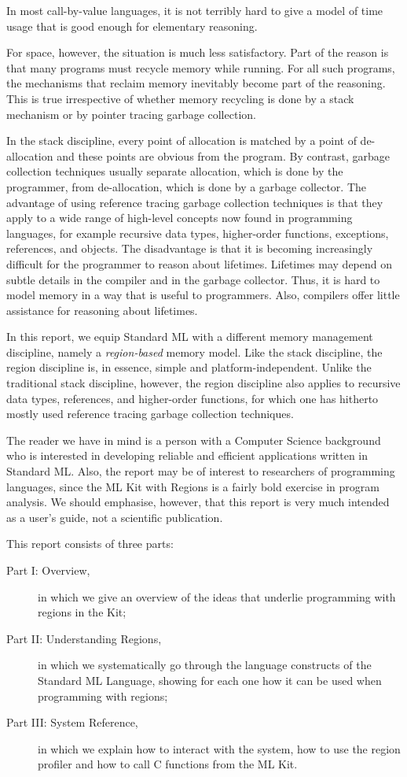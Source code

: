 \documentclass[12pt]{book}
\begin{document}
In most call-by-value languages, it is not terribly hard to give a
model of time usage that is good enough for elementary reasoning. 

For space, however, the situation is much less satisfactory. Part of
the reason is that many programs must recycle memory while running.
For all such programs, the mechanisms that reclaim memory inevitably
become part of the reasoning.  This is true irrespective of whether memory
recycling is done by a stack mechanism or by pointer tracing garbage
collection.

In the stack discipline, every point of allocation is matched by a
point of de-allocation and these points are obvious from the
program. By contrast, garbage collection techniques usually separate
allocation, which is done by the programmer, from de-allocation, which
is done by a garbage collector.  The advantage of using reference
tracing 
%
garbage collection techniques is that they apply to a wide range of
high-level concepts now found in programming languages, for example
recursive data types, higher-order functions, exceptions, references,
and objects. The disadvantage is that it is becoming increasingly
difficult for the programmer to reason about lifetimes. Lifetimes may
depend on subtle details in the compiler and in the garbage collector.
Thus, it is hard to model memory in a way that is useful to
programmers. Also, compilers offer little assistance for reasoning
about lifetimes.

In this report, we equip Standard ML with a different memory management
discipline,  namely a {\em region-based} memory model.
Like the stack discipline, the region discipline is, in essence, simple and
platform-independent. Unlike the traditional stack discipline,
however, the region discipline also applies to recursive data types,
references, and higher-order functions, for which one has hitherto
mostly used reference tracing garbage collection techniques.

The reader we have in mind is a person with a Computer Science
background who is interested in developing reliable and efficient
applications written in Standard ML. Also, the report may be of
interest to researchers of programming languages, since the ML Kit
with Regions is a fairly bold exercise in program analysis. We should
emphasise, however, that this report is very much intended as a user's
guide, not a scientific publication.

This report consists of three parts:
\begin{description}
\item[Part I: Overview,] in which we give an overview of the ideas that underlie programming with
regions in the Kit;
\item[Part II: Understanding Regions,] in which we systematically
go through the language constructs of the Standard ML Language,
showing for each one how it can be used when programming with regions;
\item[Part III: System Reference,] in which we explain how to interact with
the system, how to use the region profiler and how to call C functions from the ML Kit.
\end{description}
\end{document}
